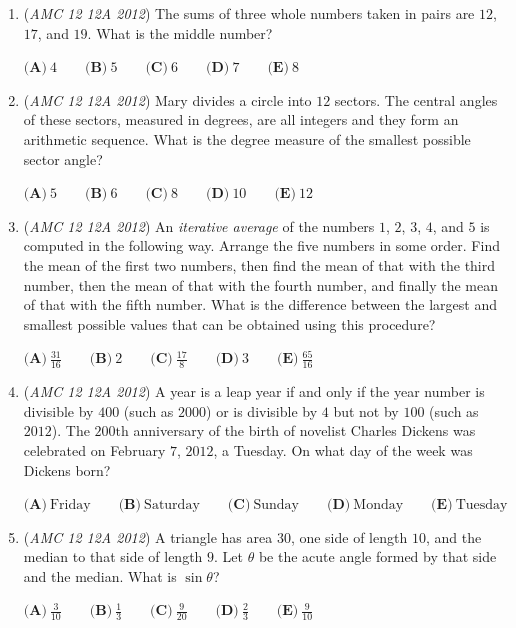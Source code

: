 \begin{enumerate}
	\item (\textit{AMC 12 12A 2012}) The sums of three whole numbers taken in pairs are $12$, $17$, and $19$.  What is the middle number?


 $\textbf{(A)}\ 4\qquad\textbf{(B)}\ 5\qquad\textbf{(C)}\ 6\qquad\textbf{(D)}\ 7\qquad\textbf{(E)}\ 8$


	\item (\textit{AMC 12 12A 2012}) Mary divides a circle into $12$ sectors.  The central angles of these sectors, measured in degrees, are all integers and they form an arithmetic sequence.  What is the degree measure of the smallest possible sector angle?


 $\textbf{(A)}\ 5\qquad\textbf{(B)}\ 6\qquad\textbf{(C)}\ 8\qquad\textbf{(D)}\ 10\qquad\textbf{(E)}\ 12$


	\item (\textit{AMC 12 12A 2012}) An \textit{iterative average} of the numbers $1$, $2$, $3$, $4$, and $5$ is computed in the following way.  Arrange the five numbers in some order.  Find the mean of the first two numbers, then find the mean of that with the third number, then the mean of that with the fourth number, and finally the mean of that with the fifth number.  What is the difference between the largest and smallest possible values that can be obtained using this procedure?


 $\textbf{(A)}\ \frac{31}{16}\qquad\textbf{(B)}\ 2\qquad\textbf{(C)}\ \frac{17}{8}\qquad\textbf{(D)}\ 3\qquad\textbf{(E)}\ \frac{65}{16}$


	\item (\textit{AMC 12 12A 2012}) A year is a leap year if and only if the year number is divisible by $400$ (such as $2000$) or is divisible by $4$ but not by $100$ (such as $2012$).  The $200\text{th}$ anniversary of the birth of novelist Charles Dickens was celebrated on February $7$, $2012$, a Tuesday.  On what day of the week was Dickens born?


 $\textbf{(A)}\ \text{Friday} \qquad\textbf{(B)}\ \text{Saturday} \qquad\textbf{(C)}\ \text{Sunday} \qquad\textbf{(D)}\ \text{Monday} \qquad\textbf{(E)}\ \text{Tuesday}$


	\item (\textit{AMC 12 12A 2012}) A triangle has area $30$, one side of length $10$, and the median to that side of length $9$.  Let $\theta$ be the acute angle formed by that side and the median.  What is $\sin{\theta}$?


 $\textbf{(A)}\ \frac{3}{10}\qquad\textbf{(B)}\ \frac{1}{3}\qquad\textbf{(C)}\ \frac{9}{20}\qquad\textbf{(D)}\ \frac{2}{3}\qquad\textbf{(E)}\ \frac{9}{10}$



\end{enumerate}
